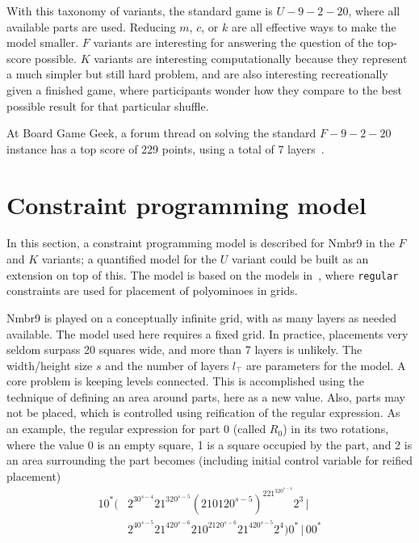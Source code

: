 \documentclass[letterpaper]{article} %
\newcommand{\cons}[1]{\texttt{#1}}
\begin{document}
With this taxonomy of variants, the standard game is $U{-}9{-}2{-}20$, where
all available parts are used. Reducing $m$, $c$, or $k$ are all
effective ways to make the model smaller.  $F$ variants are
interesting for answering the question of the top-score possible. $K$
variants are interesting computationally because they represent a much
simpler but still hard problem, and are also interesting
recreationally given a finished game, where participants wonder how
they compare to the best possible result for that particular shuffle.

At Board Game Geek, a forum thread on solving the standard
$F{-}9{-}2{-}20$ instance has a top
score of 229 points, using a total of 7 layers~\cite{Kuenzler2018}.

\section{Constraint programming model}
\label{sec:model}

In this section, a constraint programming model is described for Nmbr9
in the $F$ and $K$ variants; a quantified model for the $U$ variant
could be built as an extension on top of this. The model is based on
the models in~\cite{Lagerkvist2008,Lagerkvist2019}, where
\cons{regular} constraints are used for placement of polyominoes in
grids. 

Nmbr9 is played on a conceptually infinite grid, with as many layers
as needed available. The model used here requires a fixed grid. In
practice, placements very seldom surpass 20 squares wide, and more
than 7 layers is unlikely. The width/height size $s$ and the number of
layers $l_\top$ are parameters for the model. A core problem is
keeping levels connected. This is accomplished using the technique of
defining an area around parts, here as a new value. Also, parts may
not be placed, which is controlled using reification of the regular
expression. As an example, the regular expression for part 0 (called
$R_0$) in its two rotations, where the value 0 is an empty square, 1
is a square occupied by the part, and 2 is an area surrounding the
part becomes (including initial control variable for reified placement)
\begin{align*}
  10^*(&2^30^{s-4}21^320^{s-5}(210120^{s-5})^221^320^{s-4}2^3\,|\\
  &2^40^{s-5}21^420^{s-6}210^2120^{s-6}21^420^{s-5}2^4)0^*\,|\,00^*
\end{align*}
\end{document}
